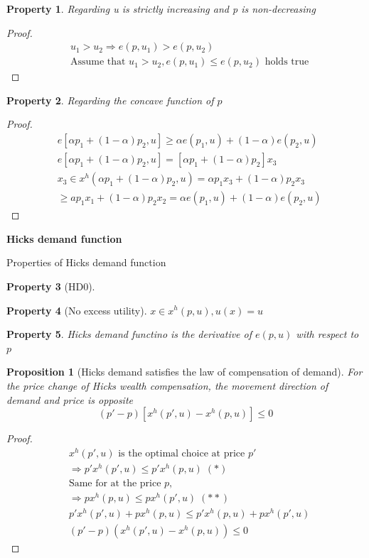 \documentclass{article}
\newtheorem{proposition}{Proposition}
\newtheorem{property}{Property}
\begin{document}
\begin{property}Regarding u is strictly increasing and p is non-decreasing
\end{property}

\begin{proof}
\begin{align}
&u_{1} > u_{2} \Rightarrow e(p,u_{1})>e(p,u_{2})
\\&\text{Assume that }u_{1}>u_{2},e(p,u_{1})\le e(p,u_{2}) \text{ holds true}
\end{align}
\end{proof}

\begin{property}Regarding the concave function of $p$
\end{property}

\begin{proof}
\begin{align}
&e[\alpha p_{1}+(1-\alpha)p_{2},u]\geqslant \alpha e(p_{1},u)+(1-\alpha)e(p_{2},u)
\\&e[\alpha p_{1}+(1-\alpha)p_{2},u]=[\alpha p_{1}+(1-\alpha)p_{2}]x_{3}
\\&x_{3} \in x^{h}(\alpha p_{1}+(1-\alpha)p_{2},u)=\alpha p_{1}x_{3}+(1-\alpha)p_{2}x_{3}
\\&\ge a p_{1}x_{1}+(1-\alpha)p_{2}x_{2}=\alpha e(p_{1},u)+(1-\alpha) e(p_{2},u)
\end{align}
\end{proof}


\textbf{Hicks demand function}

Properties of Hicks demand function
\begin{property}[HD0]
\end{property}

\begin{property}[No excess utility]
$x\in x^{h}(p,u),u(x)=u$
\end{property}


\begin{property}
Hicks demand functino is the derivative of $e(p,u)$ with respect to $p$
\end{property}

\begin{proposition}[Hicks demand satisfies the law of compensation of demand]
For the price change of Hicks wealth compensation, the movement direction of demand and price is opposite
$$(p'-p)[x^{h}(p',u)-x^{h}(p,u)]\leqslant 0$$
\end{proposition}

\begin{proof}
\begin{align}
&x^{h}(p',u) \text{ is the optimal choice at price }p'
\\&\Rightarrow p'x^{h}(p',u)\le p' x^{h}(p,u)\;(*)
\\&\text{Same for at the price }p,
\\&\Rightarrow px^{h}(p,u)\le p x^{h}(p',u)\;(**)
\\&p' x^{h}(p',u)+p x^{h}(p,u)\le p' x^{h}(p,u)+p x^{h}(p',u)
\\&(p'-p)(x^{h}(p',u)-x^{h}(p,u))\le 0
\end{align}
\end{proof}
\end{document}
